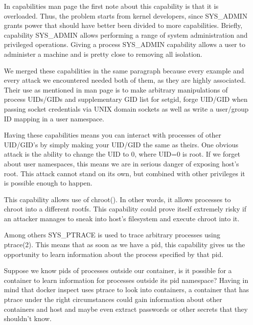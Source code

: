 \begin{description}[style=nextline]
\item[SYS\_ADMIN]
In capabilities man page the first note about this capability is that it is overloaded. Thus, the problem starts from kernel developers, since SYS\_ADMIN grants power that should have better been divided to more capabilities. Briefly, capability SYS\_ADMIN allows performing a range of system administration and privileged operations. Giving a process SYS\_ADMIN capability allows a user to administer a machine and is pretty close to removing all isolation.

\item[SETUID \& SETGID]
We merged these capabilities in the same paragraph because every example and every attack we encountered needed both of them, as they are highly associated. Their use as mentioned in man page is to make arbitrary manipulations of process UIDs/GIDs and supplementary GID list for setgid, forge UID/GID when passing socket credentials via UNIX domain sockets as well as write a user/group ID mapping in a user namespace.

Having these capabilities means you can interact with processes of other UID/GID's by simply making your UID/GID the same as theirs.
One obvious attack is the ability to change the UID to 0, where UID=0 is root. If we forget about user namespaces, this means we are in serious danger of exposing host's root. This attack cannot stand on its own, but combined with other privileges it is possible enough to happen. 

\item[SYS\_CHROOT]
This capability allows use of chroot(). In other words, it allows processes to chroot into a different rootfs. This capability could prove itself extremely risky if an attacker manages to sneak into host's filesystem and execute chroot into it.

\item[SYS\_PTRACE]
Among others SYS\_PTRACE is used to trace arbitrary processes using ptrace(2). This means that as soon as we have a pid, this capability gives us the opportunity to learn information about the process specified by that pid.

Suppose we know pids of processes outside our container, is it possible for a container to learn information for processes outside its pid namespace? Having in mind that docker inspect uses ptrace to look into containers, a container that has ptrace under the right circumstances could gain information about other containers and host and maybe even extract passwords or other secrets that they shouldn't know.


\end{description}
